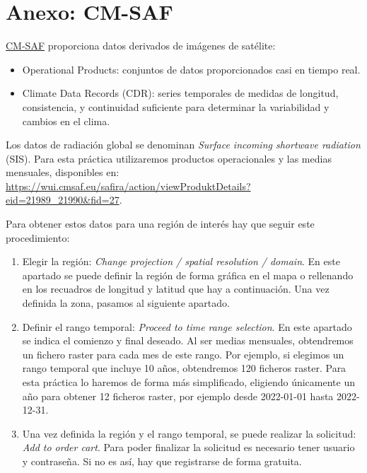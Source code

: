 \documentclass[11pt]{article}
\begin{document}
\section{Anexo: CM-SAF}
\label{sec:cmsaf}
\href{https://wui.cmsaf.eu/safira/action/viewProduktSearch}{CM-SAF}
proporciona datos derivados de imágenes de satélite:
\begin{itemize}
\item Operational Products: conjuntos de datos proporcionados casi en
  tiempo real.

\item Climate Data Records (CDR): series temporales de medidas de
  longitud, consistencia, y continuidad suficiente para determinar la
  variabilidad y cambios en el clima.
\end{itemize}

Los datos de radiación global se denominan \emph{Surface incoming shortwave radiation} (SIS). Para esta práctica utilizaremos productos operacionales y las medias mensuales, disponibles en: \url{https://wui.cmsaf.eu/safira/action/viewProduktDetails?eid=21989_21990&fid=27}.

Para obtener estos datos para una región de interés hay que seguir este procedimiento:

\begin{enumerate}
\item Elegir la región: \emph{Change projection / spatial resolution / domain}. En este apartado se puede definir la región de forma gráfica en el mapa o rellenando en los recuadros de longitud y latitud que hay a continuación. Una vez definida la zona, pasamos al siguiente apartado.
\item Definir el rango temporal: \emph{Proceed to time range selection}. En este apartado se indica el comienzo y final deseado. Al ser medias mensuales, obtendremos un fichero raster para cada mes de este rango. Por ejemplo, si elegimos un rango temporal que incluye 10 años, obtendremos 120 ficheros raster. Para esta práctica lo haremos de forma más simplificado, eligiendo únicamente un año para obtener 12 ficheros raster, por ejemplo desde 2022-01-01 hasta 2022-12-31. 
\item Una vez definida la región y el rango temporal, se puede realizar la solicitud: \emph{Add to order cart}. Para poder finalizar la solicitud es necesario tener usuario y contraseña. Si no es así, hay que registrarse de forma gratuita.
\end{enumerate}
\end{document}
